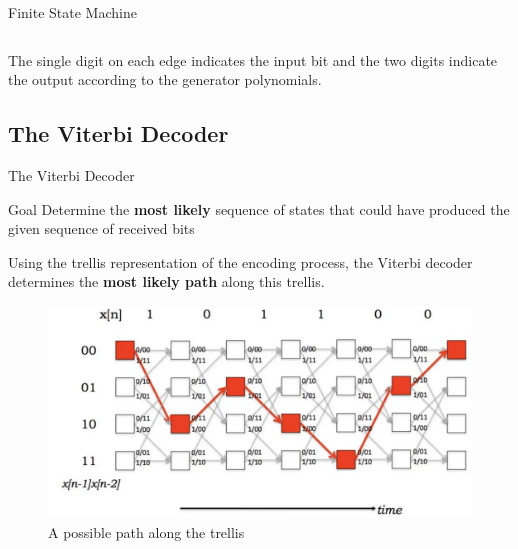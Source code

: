 \documentclass{beamer}
\newcommand{\<}				{\langle}
\renewcommand{\>}      		{\rangle}
\begin{document}
\begin{frame}{Finite State Machine}
\begin{columns}
\begin{column}{0.6\textwidth}
\end{column}
\end{columns}

The single digit on each edge indicates the input bit and the two digits indicate the output according to the generator polynomials.

\end{frame}

\subsection{The Viterbi Decoder} 

\begin{frame}{The Viterbi Decoder}

\begin{block}{Goal}
Determine the \textbf{most likely} sequence of states that could have produced the given sequence of received bits
\end{block}

Using the trellis representation of the encoding process, the Viterbi decoder determines the \textbf{most likely path} along this trellis.

\begin{figure}[h]
\includegraphics[scale=0.2]{viterbi.png}
\caption{A possible path along the trellis}
\end{figure}





\end{frame}
\end{document}
